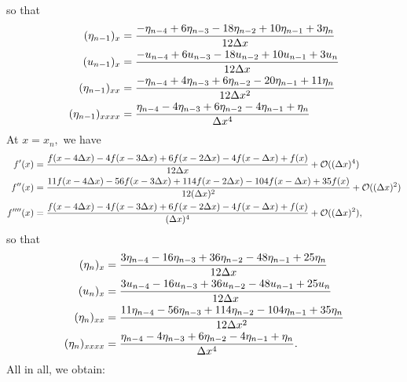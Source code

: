 \documentclass[10pt,reqno,oneside,a4paper, landscape]{article}
\begin{document}
so that
\begin{align*}
(\eta_{n-1})_x &= \frac{-\eta_{n-4} + 6 \eta_{n-3} - 18 \eta_{n-2} +10 \eta_{n-1} + 3\eta_n}{12\Delta x} \\
(u_{n-1})_x &= \frac{-u_{n-4} + 6 u_{n-3} - 18 u_{n-2} +10 u_{n-1} + 3u_n}{12\Delta x} \\
(\eta_{n-1})_{xx} &= \frac{-\eta_{n-4} + 4 \eta_{n-3} + 6 \eta_{n-2} -20 \eta_{n-1} + 11\eta_n}{12\Delta x^2} \\
(\eta_{n-1})_{xxxx} &= \frac{\eta_{n-4} -4 \eta_{n-3} +6 \eta_{n-2} -4 \eta_{n-1} + \eta_n}{\Delta x^4}
\end{align*}
At $x= x_{n},$ we have
\begin{align*}
f'(x)&= \frac{f(x-4\Delta x)-4f(x-3\Delta x) +6 f(x- 2\Delta x) -4f(x- \Delta x) +f(x)}{12\Delta x} + \mathcal{O}((\Delta x)^4) \\
f''(x)&= \frac{11f(x-4\Delta x)-56f(x-3\Delta x) +114 f(x- 2\Delta x) -104f(x- \Delta x) +35f(x)}{12(\Delta x)^2} + \mathcal{O}((\Delta x)^2) \\
f''''(x)&= \frac{f(x-4\Delta x)-4f(x-3\Delta x) +6 f(x- 2\Delta x) -4f(x- \Delta x) +f(x)}{(\Delta x)^4} + \mathcal{O}((\Delta x)^2),
\end{align*}
so that 
\begin{align*} 
(\eta_{n})_x &= \frac{3\eta_{n-4} - 16 \eta_{n-3} + 36 \eta_{n-2} - 48  \eta_{n-1} + 25\eta_n}{12\Delta x} \\
(u_{n})_x &= \frac{3u_{n-4} - 16 u_{n-3} +3 6 u_{n-2} -48 u_{n-1} + 25 u_n}{12\Delta x} \\
(\eta_{n})_{xx} &= \frac{11\eta_{n-4} -56 \eta_{n-3} + 114 \eta_{n-2} -104 \eta_{n-1} + 35\eta_n}{12\Delta x^2} \\
(\eta_{n})_{xxxx} &= \frac{\eta_{n-4} -4 \eta_{n-3} +6 \eta_{n-2} -4 \eta_{n-1} + \eta_n}{\Delta x^4}.
\end{align*}
All in all, we obtain:
\end{document}
